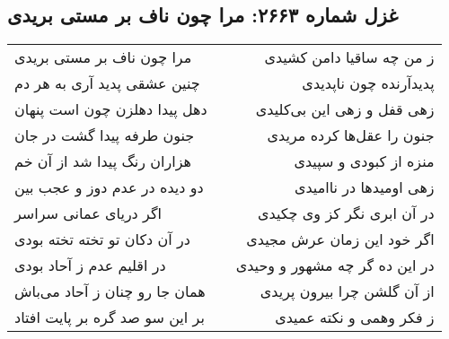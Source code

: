 \begin{center}
\section*{غزل شماره ۲۶۶۳: مرا چون ناف بر مستی بریدی}
\label{sec:2663}
\begin{longtable}{l p{0.5cm} r}
مرا چون ناف بر مستی بریدی
&&
ز من چه ساقیا دامن کشیدی
\\
چنین عشقی پدید آری به هر دم
&&
پدیدآرنده چون ناپدیدی
\\
دهل پیدا دهلزن چون است پنهان
&&
زهی قفل و زهی این بی‌کلیدی
\\
جنون طرفه پیدا گشت در جان
&&
جنون را عقل‌ها کرده مریدی
\\
هزاران رنگ پیدا شد از آن خم
&&
منزه از کبودی و سپیدی
\\
دو دیده در عدم دوز و عجب بین
&&
زهی اومیدها در ناامیدی
\\
اگر دریای عمانی سراسر
&&
در آن ابری نگر کز وی چکیدی
\\
در آن دکان تو تخته تخته بودی
&&
اگر خود این زمان عرش مجیدی
\\
در اقلیم عدم ز آحاد بودی
&&
در این ده گر چه مشهور و وحیدی
\\
همان جا رو چنان ز آحاد می‌باش
&&
از آن گلشن چرا بیرون پریدی
\\
بر این سو صد گره بر پایت افتاد
&&
ز فکر وهمی و نکته عمیدی
\\
\end{longtable}
\end{center}

